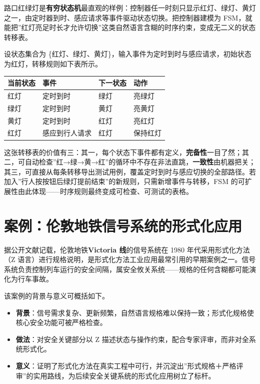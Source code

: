 \documentclass[
]{ctexbook}
\providecommand{\tightlist}{\setlength{\itemsep}{0pt}\setlength{\parskip}{0pt} }
\newcounter{none}
\begin{document}
路口红绿灯是\textbf{有穷状态机}最直观的样例：控制器任一时刻只显示红灯、绿灯、黄灯之一，由定时器到时、感应请求等事件驱动状态切换。把控制器建模为
FSM，就能把''红灯亮足时长才允许切换''这类自然语言含糊的时序约束，变成无二义的状态转移表。

设状态集合为
\{红灯、绿灯、黄灯\}，输入事件为定时到时与感应请求，初始状态为红灯，转移规则如下表所示。

{\def\LTcaptype{none} %
\begin{longtable}[]{@{}llll@{}}
\toprule\noalign{}
当前状态 & 事件 & 下一状态 & 动作 \\
\midrule\noalign{}
\endhead
\bottomrule\noalign{}
\endlastfoot
红灯 & 定时到时 & 绿灯 & 亮绿灯 \\
绿灯 & 定时到时 & 黄灯 & 亮黄灯 \\
黄灯 & 定时到时 & 红灯 & 亮红灯 \\
红灯 & 感应到行人请求 & 红灯 & 保持红灯 \\
\end{longtable}
}

这张转移表的价值有三：其一，每个状态下事件都有定义，\textbf{完备性}一目了然；其二，可自动检查''红→绿→黄→红''的循环中不存在非法直跳，\textbf{一致性}由机器把关；其三，可直接从每条转移导出测试用例，覆盖定时到时与感应切换的全部路径。若加入''行人按按钮后绿灯提前结束''的新规则，只需新增事件与转移，FSM
的可扩展性由此体现------时序规则最终变成可检查、可测试的表格。

\section{案例：伦敦地铁信号系统的形式化应用}\label{ux6848ux4f8bux4f26ux6566ux5730ux94c1ux4fe1ux53f7ux7cfbux7edfux7684ux5f62ux5f0fux5316ux5e94ux7528}

据公开文献记载，伦敦地铁\textbf{Victoria 线}的信号系统在 1980
年代采用形式化方法（Z
语言）进行规格说明，是形式化方法工业应用最常引用的早期案例之一。信号系统负责控制列车运行的安全间隔，属安全攸关系统------规格的任何含糊都可能演化为行车事故。

该案例的背景与意义可概括如下。

\begin{itemize}
\tightlist
\item
  \textbf{背景}：信号需求复杂、更新频繁，自然语言规格难以保持一致；形式化规格使核心安全功能可被严格检查。
\item
  \textbf{做法}：对安全关键部分以 Z
  描述状态与操作约束，配合专家评审，而非对全系统形式化。
\item
  \textbf{意义}：证明了形式化方法在真实工程中可行，并沉淀出''形式规格＋严格评审''的实用路线，为后续安全关键系统的形式化应用树立了标杆。
\end{itemize}
\end{document}
